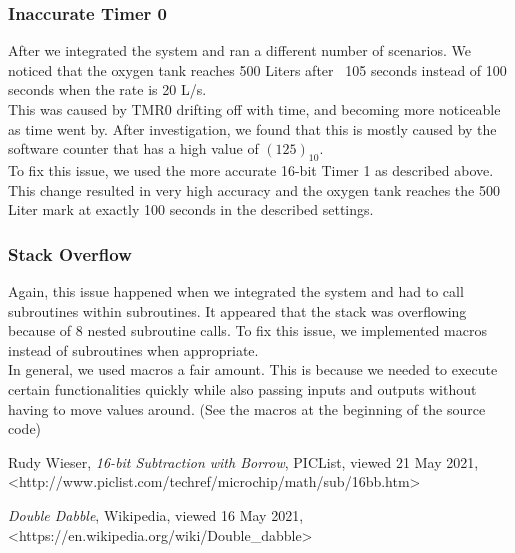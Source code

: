 \documentclass[a4paper, 12pt]{article}
\begin{document}
\subsubsection{Inaccurate Timer 0}
After we integrated the system and ran a different number of scenarios. We noticed that the oxygen tank reaches 500 Liters after ~105 seconds instead of 100 seconds when the rate is 20 L/s.  \\

This was caused by TMR0 drifting off with time, and becoming more noticeable as time went by. After investigation, we found that this is mostly caused by the software counter that has a high value of $(125)_{10}$. \\

To fix this issue, we used the more accurate 16-bit Timer 1 as described above. \\

This change resulted in very high accuracy and the oxygen tank reaches the 500 Liter mark at exactly 100 seconds in the described settings. \\


\subsubsection{Stack Overflow}
Again, this issue happened when we integrated the system and had to call subroutines within subroutines. It appeared that the stack was overflowing because of 8 nested subroutine calls. To fix this issue, we implemented macros instead of subroutines when appropriate.  \\

In general, we used macros a fair amount. This is because we needed to execute certain functionalities quickly while also passing inputs and outputs without having to move values around. (See the macros at the beginning of the source code) \\



\begin{thebibliography}{10}

  Rudy Wieser,
  \textit{16-bit Subtraction with Borrow},
  PICList, 
  viewed 21 May 2021,
  \textless http://www.piclist.com/techref/microchip/math/sub/16bb.htm\textgreater

  \textit{Double Dabble},
  Wikipedia, 
  viewed 16 May 2021,
 \textless https://en.wikipedia.org/wiki/Double\_dabble\textgreater

\end{thebibliography}
\end{document}
